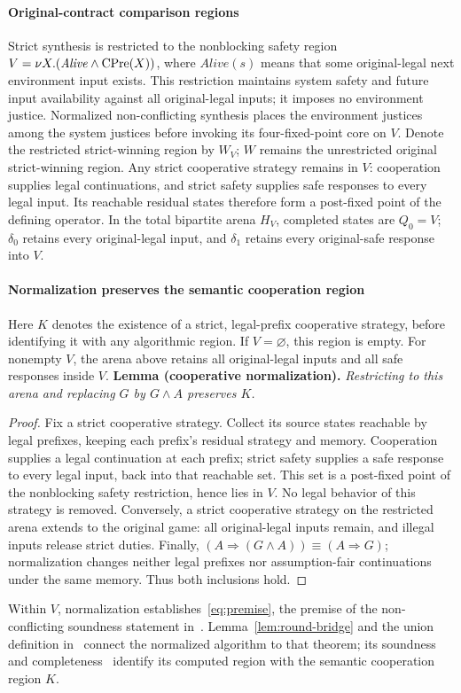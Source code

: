 \paragraph{Original-contract comparison regions}
Strict synthesis is restricted to the
nonblocking safety region $V=\nu X.(\mathit{Alive}\land\operatorname{CPre}(X))$, where
$\mathit{Alive}(s)$ means that some original-legal next environment
input exists. This restriction maintains system safety and future input
availability against all original-legal inputs; it imposes no environment
justice. Normalized non-conflicting synthesis places the environment
justices among the system justices before invoking its four-fixed-point
core on $V$. Denote the restricted strict-winning region by $W_V$;
$W$ remains the unrestricted original strict-winning region. Any strict cooperative
strategy remains in $V$: cooperation supplies legal continuations,
and strict safety supplies safe responses to every legal input. Its
reachable residual states therefore form a post-fixed point of the
defining operator. In the total bipartite arena $H_V$, completed states
are $Q_0=V$; $\delta_0$ retains every original-legal input, and $\delta_1$
retains every original-safe response into $V$.
\paragraph{Normalization preserves the semantic cooperation region}
Here $K$ denotes the existence of a strict, legal-prefix cooperative
strategy, before identifying it with any algorithmic region. If
$V=\varnothing$, this region is empty. For nonempty $V$, the arena above
retains all original-legal inputs and all safe responses inside $V$.
\noindent\textbf{Lemma (cooperative normalization).}
\emph{Restricting to this arena and replacing $G$ by $G\land A$
preserves $K$.}
\begin{proof}
Fix a strict cooperative strategy. Collect its source states reachable
by legal prefixes, keeping each prefix's residual strategy and memory.
Cooperation supplies a legal continuation at each prefix; strict safety
supplies a safe response to every legal input, back into that reachable
set. This set is a post-fixed point of the nonblocking safety restriction,
hence lies in $V$. No legal behavior of this strategy is removed.
Conversely, a strict cooperative strategy on the restricted arena
extends to the original game: all original-legal inputs remain, and
illegal inputs release strict duties. Finally,
$(A\Rightarrow(G\land A))\equiv(A\Rightarrow G)$; normalization changes
neither legal prefixes nor assumption-fair continuations under the same
memory. Thus both inclusions hold.
\end{proof}

Within $V$, normalization establishes~\eqref{eq:premise}, the premise of
the non-conflicting soundness statement in~\cite[Theorem~3]{friendly}.
Lemma~\ref{lem:round-bridge} and the union definition in~\cite[Appendix~B.1]{friendly}
connect the normalized algorithm to that theorem; its soundness and
completeness~\cite[Theorem~3 and Appendix~B.2]{friendly}
identify its computed region with the semantic cooperation region $K$.

